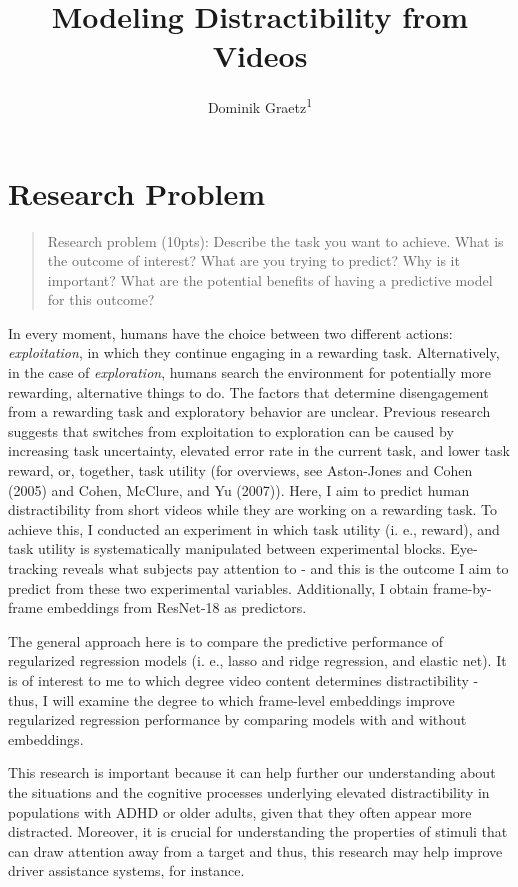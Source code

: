 \documentclass[
  man,floatsintext]{apa6}
\title{Modeling Distractibility from Videos}
\author{Dominik Graetz\textsuperscript{1}}
\date{}
\affiliation{\vspace{0.5cm}\textsuperscript{1} University of Oregon}
\begin{document}
\maketitle

\hypertarget{research-problem}{%
\section{Research Problem}\label{research-problem}}

\begin{quote}
Research problem (10pts): Describe the task you want to achieve. What is the outcome of interest? What are you trying to predict? Why is it important? What are the potential benefits of having a predictive model for this outcome?
\end{quote}

In every moment, humans have the choice between two different actions: \emph{exploitation}, in which they continue engaging in a rewarding task. Alternatively, in the case of \emph{exploration}, humans search the environment for potentially more rewarding, alternative things to do. The factors that determine disengagement from a rewarding task and exploratory behavior are unclear. Previous research suggests that switches from exploitation to exploration can be caused by increasing task uncertainty, elevated error rate in the current task, and lower task reward, or, together, task utility (for overviews, see Aston-Jones and Cohen (2005) and Cohen, McClure, and Yu (2007)). Here, I aim to predict human distractibility from short videos while they are working on a rewarding task. To achieve this, I conducted an experiment in which task utility (i. e., reward), and task utility is systematically manipulated between experimental blocks. Eye-tracking reveals what subjects pay attention to - and this is the outcome I aim to predict from these two experimental variables. Additionally, I obtain frame-by-frame embeddings from ResNet-18 as predictors.

The general approach here is to compare the predictive performance of regularized regression models (i. e., lasso and ridge regression, and elastic net). It is of interest to me to which degree video content determines distractibility - thus, I will examine the degree to which frame-level embeddings improve regularized regression performance by comparing models with and without embeddings.

This research is important because it can help further our understanding about the situations and the cognitive processes underlying elevated distractibility in populations with ADHD or older adults, given that they often appear more distracted. Moreover, it is crucial for understanding the properties of stimuli that can draw attention away from a target and thus, this research may help improve driver assistance systems, for instance.
\end{document}
